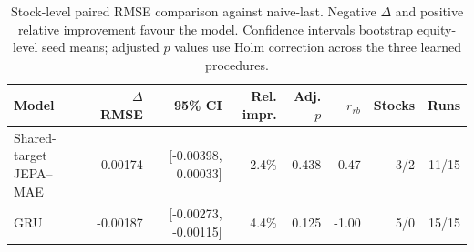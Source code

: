 \begin{table}[t]
\centering
\small
\caption{Stock-level paired RMSE comparison against naive-last. Negative $\Delta$ and positive relative improvement favour the model. Confidence intervals bootstrap equity-level seed means; adjusted $p$ values use Holm correction across the three learned procedures.}
\label{tab:paired_rmse_naive}
\begin{tabular}{lrrrrrrr}
\toprule
Model & $\Delta$RMSE & 95\% CI & Rel. impr. & Adj. $p$ & $r_{rb}$ & Stocks & Runs \\
\midrule
Shared-target JEPA--MAE & -0.00174 & [-0.00398, 0.00033] & 2.4\% & 0.438 & -0.47 & 3/2 & 11/15 \\
GRU & -0.00187 & [-0.00273, -0.00115] & 4.4\% & 0.125 & -1.00 & 5/0 & 15/15 \\
\bottomrule
\end{tabular}
\end{table}

